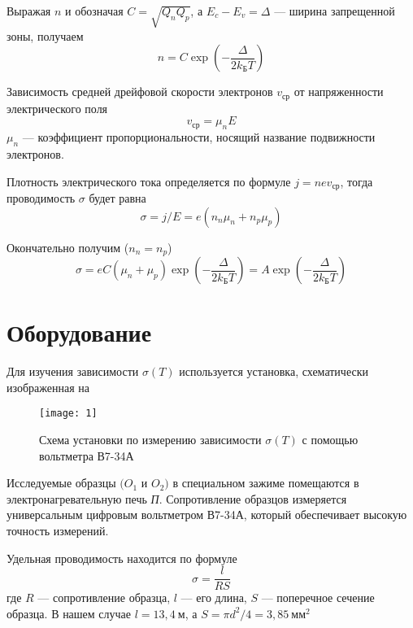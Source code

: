 \documentclass[a4paper, 12pt]{article}
\begin{document}
Выражая $n$ и обозначая $C = \sqrt{Q_{n}Q_{p}}$, а $E_{c}-E_{v} =
\Delta$ --- ширина запрещенной зоны, получаем
\begin{equation}
    n= C \exp \left(- \frac{\Delta}{2k_{Б}T}\right)
    \label{eq:4}
\end{equation}

Зависимость средней дрейфовой скорости электронов $v_{ср}$ от
напряженности электрического поля
\begin{equation}
    v_{ср}=\mu_{n}E
    \label{eq:5}
\end{equation}
$\mu_{n}$ --- коэффициент пропорциональности, носящий название
подвижности электронов.

Плотность электрического тока определяется по формуле $j = n e
v_{ср}$, тогда проводимость $\sigma$ будет равна 
\begin{equation}
    \sigma = j/E = e \left(n_{n} \mu_{n} + n_{p}\mu_{p}\right)
    \label{eq:6}
\end{equation}

Окончательно получим ($n_{n}=n_{p}$)
\begin{equation}
    \sigma = e C \left(\mu_{n} + \mu_{p}\right) \exp \left(-
    \frac{\Delta}{2k_{Б}T}\right) = A \exp \left(-
\frac{\Delta}{2k_{Б}T}\right)
    \label{eq:7}
\end{equation}



\section{Оборудование}
Для изучения зависимости $\sigma(T)$ используется установка,
схематически изображенная на 

\begin{figure}[H]
    \texttt{[image: 1]} 
    \caption{Схема установки по измерению зависимости $\sigma(T)$ с
    помощью вольтметра В7-34А}
    \label{fig:1}
\end{figure}

Исследуемые образцы $(O_{1}$ и $O_{2})$ в специальном зажиме помещаются
в электронагревательную печь \textit{П}. Сопротивление образцов
измеряется универсальным цифровым вольтметром В7-34А, который
обеспечивает высокую точность измерений.

Удельная проводимость находится по формуле 
\begin{equation}
    \sigma = \frac{l}{RS}
    \label{eq:8}
\end{equation}
где $R$ --- сопротивление образца, $l$ --- его длина, $S$ ---
поперечное сечение образца. В нашем случае $l = 13,4\: м$, а $S = \pi
d^2/4 = 3,85\: мм^2$
\end{document}
